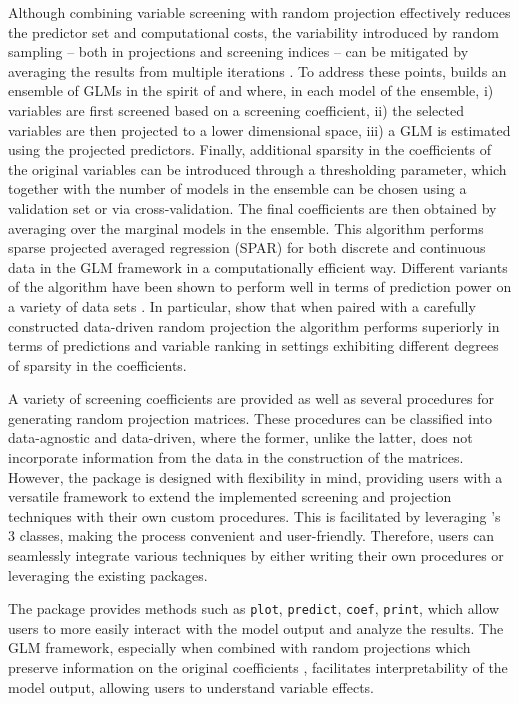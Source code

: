 \documentclass[
  article,
  nojss]{jss}
\begin{document}
Although combining variable screening with random projection effectively
reduces the predictor set and computational costs, the variability
introduced by random sampling -- both in projections and screening
indices -- can be mitigated by averaging the results from multiple
iterations \citep{Thanei2017RPforHDR}. To address these points,
 builds an ensemble of GLMs in the spirit of
\citet{Dunson2020TargRandProj} and \citet{parzer2024glms} where, in each
model of the ensemble, i) variables are first screened based on a
screening coefficient, ii) the selected variables are then projected to
a lower dimensional space, iii) a GLM is estimated using the projected
predictors. Finally, additional sparsity in the coefficients of the
original variables can be introduced through a thresholding parameter,
which together with the number of models in the ensemble can be chosen
using a validation set or via cross-validation. The final coefficients
are then obtained by averaging over the marginal models in the ensemble.
This algorithm performs sparse projected averaged regression (SPAR) for
both discrete and continuous data in the GLM framework in a
computationally efficient way. Different variants of the algorithm have
been shown to perform well in terms of prediction power on a variety of
data sets \citep[see][]{Dunson2020TargRandProj}. In particular,
\citet{parzer2024glms} show that when paired with a carefully
constructed data-driven random projection the algorithm performs
superiorly in terms of predictions and variable ranking in settings
exhibiting different degrees of sparsity in the coefficients.

A variety of screening coefficients are provided as well as several
procedures for generating random projection matrices. These procedures
can be classified into data-agnostic and data-driven, where the former,
unlike the latter, does not incorporate information from the data in the
construction of the matrices. However, the package is designed with
flexibility in mind, providing users with a versatile framework to
extend the implemented screening and projection techniques with their
own custom procedures. This is facilitated by leveraging 's
3 classes, making the process convenient and user-friendly.
Therefore, users can seamlessly integrate various techniques by either
writing their own procedures or leveraging the existing 
packages.

The package provides methods such as \texttt{plot}, \texttt{predict},
\texttt{coef}, \texttt{print}, which allow users to more easily interact
with the model output and analyze the results. The GLM framework,
especially when combined with random projections which preserve
information on the original coefficients \citep[such as the one
in][]{parzer2024glms}, facilitates interpretability of the model output,
allowing users to understand variable effects.
\end{document}
